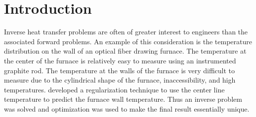 \documentclass[preprint,12pt]{elsarticle}
\begin{document}
\nomenclature[A]{ }{ }

\begin{table}[!t]
  \begin{framed}
    \printnomenclature
  \end{framed}
\end{table}

\section{Introduction}

Inverse heat transfer problems are often of greater interest to engineers than the associated forward problems.  An example of this consideration is the temperature distribution on the wall of an optical fiber drawing furnace.  The temperature at the center of the furnace is relatively easy to measure using an instrumented graphite rod.  The temperature at the walls of the furnace is very difficult to measure due to the cylindrical shape of the furnace, inaccessibility, and high temperatures.  \citet{issa} developed a regularization technique to use the center line temperature to predict the furnace wall temperature.  Thus an inverse problem was solved and optimization was used to make the final result essentially unique.
\end{document}
